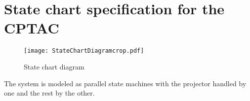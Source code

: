 \documentclass[Main_Assignment2]{subfiles}
\begin{document}
\section{State chart specification for the CPTAC}

\begin{figure}[H]
\centering
\texttt{[image: StateChartDiagramcrop.pdf]}
\caption{State chart diagram}
\label{fig:stateChart}
\end{figure}

The system is modeled as parallel state machines with the projector handled by one and the rest by the other.
\end{document}
